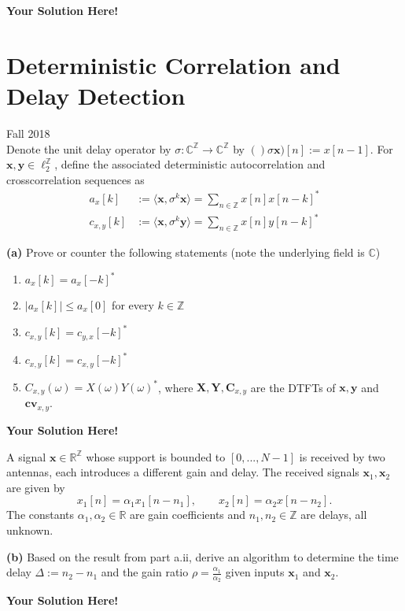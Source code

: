 \documentclass[12pt]{article}
\newcommand{\cv}{\mathbf{cv}}
\newcommand{\C}{\mathbf{C}}
\newcommand{\x}{\mathbf{x}}
\newcommand{\y}{\mathbf{y}}
\newcommand{\0}{\mathbf{0}}
\newcommand{\1}{\mathbf{1}}
\newcommand{\X}{\mathbf{X}}
\newcommand{\Y}{\mathbf{Y}}
\newcommand{\solspace}{\vspace{3mm} \textbf{Your Solution Here!} \vspace{3mm}}
\begin{document}
\solspace

\pagebreak

\section{Deterministic Correlation and Delay Detection}
Fall 2018\\
Denote the unit delay operator by $\sigma : \mathbb{C}^\mathbb{Z} \rightarrow \mathbb{C}^\mathbb{Z}$ by $()\sigma \x)[n] := x[n-1]$. For $\x, \y \in \ell_2^{\mathbb{Z}}$, define the associated deterministic autocorrelation and crosscorrelation sequences as
\begin{align}
    a_x[k] &:= \langle\x, \sigma^k \x \rangle = \sum_{n \in \mathbb{Z}} x[n] x[n-k]^* \\
    c_{x,y}[k] &:= \langle\x, \sigma^k \y \rangle = \sum_{n \in \mathbb{Z}} x[n] y[n-k]^*
\end{align}

\textbf{(a)} Prove or counter the following statements (note the underlying field is $\mathbb{C}$)
\begin{enumerate}
    \item $a_x[k] = a_x[-k]^*$
    \item $|a_x[k]| \leq a_x[0]$ for every $k \in \mathbb{Z}$
    \item $c_{x,y}[k] = c_{y,x}[-k]^*$
    \item $c_{x,y}[k] = c_{x,y}[-k]^*$
    \item $C_{x,y}(\omega) = X(\omega)Y(\omega)^*$, where $\X,\Y,\C_{x,y}$ are the DTFTs of $\x,\y$ and $\cv_{x,y}$.
\end{enumerate}

\solspace

A signal $\x \in \mathbb{R}^\mathbb{Z}$ whose support is bounded to $[0,...,N-1]$ is received by two antennas, each introduces a different gain and delay. The received signals $\x_1, \x_2$ are given by
\begin{equation}
    x_1[n] = \alpha_1 x_1[n - n_1], \qquad x_2[n] = \alpha_2 x[n-n_2].
\end{equation}
The constants $\alpha_1, \alpha_2 \in \mathbb{R}$ are gain coefficients and $n_1, n_2 \in \mathbb{Z}$ are delays, all unknown.

\textbf{(b)} Based on the result from part a.ii, derive an algorithm to determine the time delay $\Delta := n_2 - n_1$ and the gain ratio $\rho = \frac{\alpha_1}{\alpha_2}$ given inputs $\x_1$ and $\x_2$.

\solspace
\end{document}
